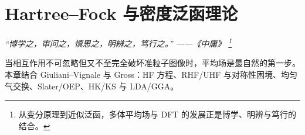 \chapter{Hartree--Fock 与密度泛函理论}
\renewcommand{\currentchapterpath}{chapters/ch04/}

\begin{flushright}
\textit{“博学之，审问之，慎思之，明辨之，笃行之。” ——《中庸》
\footnote{从变分原理到近似泛函，多体平均场与 DFT 的发展正是博学、明辨与笃行的结合。}}
\end{flushright}

当相互作用不可忽略但又不至完全破坏准粒子图像时，平均场是最自然的第一步。本章结合 Giuliani--Vignale 与 Gross：HF 方程、RHF/UHF 与对称性困境、均匀气交换、Slater/OEP、HK/KS 与 LDA/GGA。


